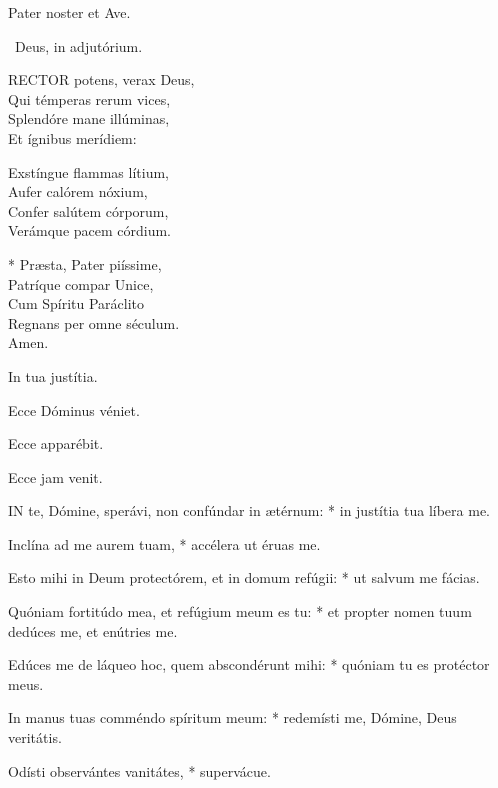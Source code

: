 
\sectionornament


Pater noster et Ave.

\V\ Deus, in adjutórium.


\lettrine[lines=2]{R}{ECTOR} potens, verax Deus,\\
Qui témperas rerum vices,\\
Splendóre mane illúminas,\\
Et ígnibus merídiem:

Exstíngue flammas lítium,\\
Aufer calórem nóxium,\\
Confer salútem córporum,\\
Verámque pacem córdium.

* Præsta, Pater piíssime,\\
Patríque compar Unice,\\
Cum Spíritu Paráclito\\
Regnans per omne séculum.\\
Amen.

  In tua justítia.


  Ecce Dóminus véniet.

  Ecce apparébit.

  Ecce jam venit.


\lettrine[lines=2]{I}{N} te, Dómine, sperávi, non confúndar in ætérnum: * in justítia tua líbera me.

Inclína ad me aurem tuam, * accélera ut éruas me.

Esto mihi in Deum protectórem, et in domum refúgii: * ut salvum me fácias.

Quóniam fortitúdo mea, et refúgium meum es tu: * et propter nomen tuum dedúces me, et enútries me.

Edúces me de láqueo hoc, quem abscondérunt mihi: * quóniam tu es protéctor meus.

In manus tuas comméndo spíritum meum: * redemísti me, Dómine, Deus veritátis.

Odísti observántes vanitátes, * supervácue.

